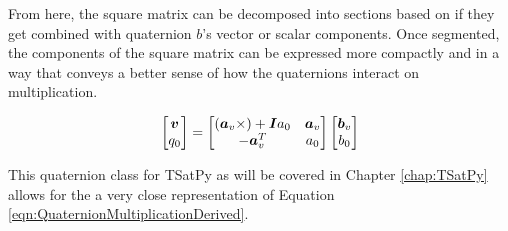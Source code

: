 From here, the square matrix can be decomposed into sections based on if they get combined with quaternion $b$'s vector or scalar components.  Once segmented, the components of the square matrix can be expressed more compactly and in a way that conveys a better sense of how the quaternions interact on multiplication.

\begin{equation}
  \begin{bmatrix} \boldsymbol{v} \\ q_0 \end{bmatrix} =
  \begin{bmatrix}
    (\boldsymbol{a}_v \times) + \boldsymbol{I} a_0 & \boldsymbol{a}_v \\
    -\boldsymbol{a}_v^T                    & a_0 \\
  \end{bmatrix}
  \begin{bmatrix}
  \boldsymbol{b}_v \\ b_0
  \end{bmatrix}
  \label{eqn:QuaternionMultiplicationDerived}
\end{equation}

This quaternion class for TSatPy as will be covered in Chapter \ref{chap:TSatPy} allows for the a very close representation of Equation \ref{eqn:QuaternionMultiplicationDerived}.




